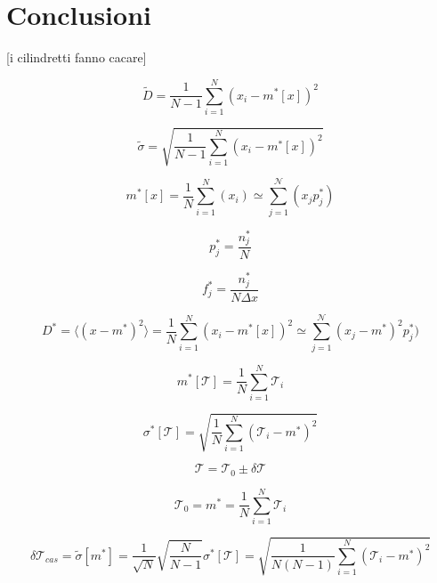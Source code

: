 \section{Conclusioni}
[i cilindretti fanno cacare]



\begin{equation}
\tilde{D} = \frac{1}{N - 1} \sum_{i=1}^{N} (x_i - m^*[x])^2
\end{equation}

\begin{equation}
\tilde{\sigma} = \sqrt{\frac{1}{N - 1} \sum_{i=1}^{N} (x_i - m^*[x])^2}
\end{equation}

\begin{equation}
m^*[x] = \frac{1}{N} \sum_{i=1}^{N} (x_i) \simeq \sum_{j=1}^{\mathcal{N}} (x_j p_j^*) 
\end{equation}

\begin{equation}
p_j^* = \frac{n_j^*}{N} 
\end{equation}

\begin{equation}
f_j^* = \frac{n_j^*}{N\Delta x}
\end{equation}

\begin{equation}
D^* = \langle(x - m^*)^2\rangle = \frac{1}{N} \sum_{i=1}^{N} (x_i - m^*[x])^2
\simeq \sum_{j=1}^{\mathcal{N}} (x_j - m^*)^2 p_j^*)
\end{equation}

\begin{equation}
m^*[\mathcal{T}] = \frac{1}{N} \sum_{i=1}^{N} \mathcal{T}_i
\end{equation}

\begin{equation}
\sigma^*[\mathcal{T}] = \sqrt{\frac{1}{N} \sum_{i=1}^{N} (\mathcal{T}_i - m^*)^2}
\end{equation}

\begin{equation}
\mathcal{T} = \mathcal{T}_0 \pm \delta\mathcal{T}
\end{equation}

\begin{equation}
\mathcal{T}_0 = m^* = \frac{1}{N} \sum_{i=1}^{N} \mathcal{T}_i
\end{equation}

\begin{equation}
\delta\mathcal{T}_{cas} = \tilde{\sigma}[m^*] = \frac{1}{\sqrt{N}} \sqrt{\frac{N}{N - 1}}\sigma^*[\mathcal{T}] = \sqrt{\frac{1}{N(N - 1)} \sum_{i=1}^{N} (\mathcal{T}_i - m^*)^2}
\end{equation}

